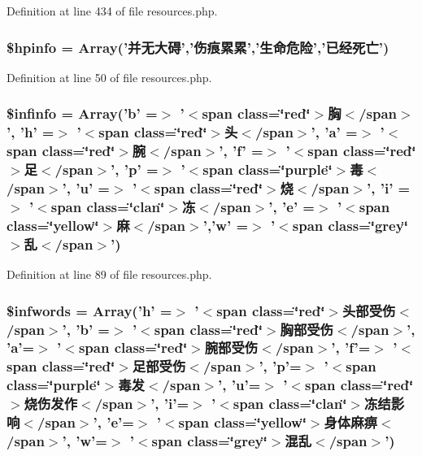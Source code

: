 Definition at line 434 of file resources.\+php.

\hypertarget{resources_8php_a6f91f38ee66d31d99255d9dc86032980}{
\subsubsection[{\$hpinfo}]{\setlength{\rightskip}{0pt plus 5cm}\$hpinfo = Array('并无大碍','伤痕累累','生命危险','已经死亡')}}\label{resources_8php_a6f91f38ee66d31d99255d9dc86032980}


Definition at line 50 of file resources.\+php.

\hypertarget{resources_8php_a33e1d274ac0cd7ca76b5cc43833f5c1f}{
\subsubsection[{\$infinfo}]{\setlength{\rightskip}{0pt plus 5cm}\$infinfo = Array('b' =$>$ '$<$span class=\char`\"{}red\char`\"{}$>$胸$<$/span$>$', 'h' =$>$ '$<$span class=\char`\"{}red\char`\"{}$>$头$<$/span$>$', 'a' =$>$ '$<$span class=\char`\"{}red\char`\"{}$>$腕$<$/span$>$', 'f' =$>$ '$<$span class=\char`\"{}red\char`\"{}$>$足$<$/span$>$', 'p' =$>$ '$<$span class=\char`\"{}purple\char`\"{}$>$毒$<$/span$>$', 'u' =$>$ '$<$span class=\char`\"{}red\char`\"{}$>$烧$<$/span$>$', 'i' =$>$ '$<$span class=\char`\"{}clan\char`\"{}$>$冻$<$/span$>$', 'e' =$>$ '$<$span class=\char`\"{}yellow\char`\"{}$>$麻$<$/span$>$','w' =$>$ '$<$span class=\char`\"{}grey\char`\"{}$>$乱$<$/span$>$')}}\label{resources_8php_a33e1d274ac0cd7ca76b5cc43833f5c1f}


Definition at line 89 of file resources.\+php.

\hypertarget{resources_8php_ac3527ff4180f28da3e03cb071838cc4d}{
\subsubsection[{\$infwords}]{\setlength{\rightskip}{0pt plus 5cm}\$infwords = Array('h' =$>$ '$<$span class=\char`\"{}red\char`\"{}$>$头部受伤$<$/span$>$', 'b' =$>$ '$<$span class=\char`\"{}red\char`\"{}$>$胸部受伤$<$/span$>$', 'a'=$>$ '$<$span class=\char`\"{}red\char`\"{}$>$腕部受伤$<$/span$>$', 'f'=$>$ '$<$span class=\char`\"{}red\char`\"{}$>$足部受伤$<$/span$>$', 'p'=$>$ '$<$span class=\char`\"{}purple\char`\"{}$>$毒发$<$/span$>$', 'u'=$>$ '$<$span class=\char`\"{}red\char`\"{}$>$烧伤发作$<$/span$>$', 'i'=$>$ '$<$span class=\char`\"{}clan\char`\"{}$>$冻结影响$<$/span$>$', 'e'=$>$ '$<$span class=\char`\"{}yellow\char`\"{}$>$身体麻痹$<$/span$>$', 'w'=$>$ '$<$span class=\char`\"{}grey\char`\"{}$>$混乱$<$/span$>$')}}\label{resources_8php_ac3527ff4180f28da3e03cb071838cc4d}


